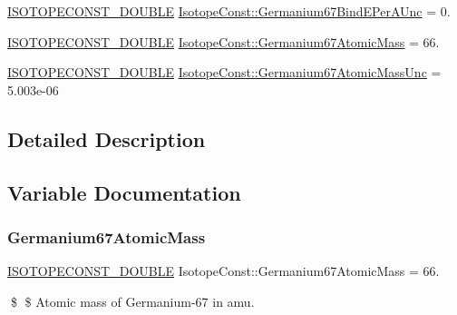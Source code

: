 \begin{DoxyCompactItemize}
\mbox{\hyperlink{group___isotope_const-_macros_ga8f45a7272ce02c0b4c65c44636ed719a}{I\+S\+O\+T\+O\+P\+E\+C\+O\+N\+S\+T\+\_\+\+D\+O\+U\+B\+LE}} \mbox{\hyperlink{group___isotope_const-_germanium-_ge67_gac8d76ed344abd7b63d25cb263dd213cf}{Isotope\+Const\+::\+Germanium67\+Bind\+E\+Per\+A\+Unc}} = 0.
\item 
\mbox{\hyperlink{group___isotope_const-_macros_ga8f45a7272ce02c0b4c65c44636ed719a}{I\+S\+O\+T\+O\+P\+E\+C\+O\+N\+S\+T\+\_\+\+D\+O\+U\+B\+LE}} \mbox{\hyperlink{group___isotope_const-_germanium-_ge67_gaab0a08200bcb707ca260a0b9339e9af7}{Isotope\+Const\+::\+Germanium67\+Atomic\+Mass}} = 66.
\item 
\mbox{\hyperlink{group___isotope_const-_macros_ga8f45a7272ce02c0b4c65c44636ed719a}{I\+S\+O\+T\+O\+P\+E\+C\+O\+N\+S\+T\+\_\+\+D\+O\+U\+B\+LE}} \mbox{\hyperlink{group___isotope_const-_germanium-_ge67_ga1ad44fe281fb2caf641f20c607c26784}{Isotope\+Const\+::\+Germanium67\+Atomic\+Mass\+Unc}} = 5.\+003e-\/06
\end{DoxyCompactItemize}


\subsection{Detailed Description}


\subsection{Variable Documentation}
\mbox{\label{group___isotope_const-_germanium-_ge67_gaab0a08200bcb707ca260a0b9339e9af7}} 
\subsubsection{\texorpdfstring{Germanium67\+Atomic\+Mass}{Germanium67AtomicMass}}
{\footnotesize\ttfamily \mbox{\hyperlink{group___isotope_const-_macros_ga8f45a7272ce02c0b4c65c44636ed719a}{I\+S\+O\+T\+O\+P\+E\+C\+O\+N\+S\+T\+\_\+\+D\+O\+U\+B\+LE}} Isotope\+Const\+::\+Germanium67\+Atomic\+Mass = 66.}

\$ \$ Atomic mass of Germanium-\/67 in amu. \mbox{\label{group___isotope_const-_germanium-_ge67_ga1ad44fe281fb2caf641f20c607c26784}} 
